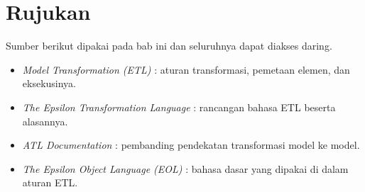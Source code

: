 \section{Rujukan}

Sumber berikut dipakai pada bab ini dan seluruhnya dapat diakses daring.

\begin{itemize}
  \item \textit{Model Transformation (ETL)} \cite{doc-etl}: aturan transformasi, pemetaan elemen, dan eksekusinya.
  \item \textit{The Epsilon Transformation Language} \cite{kolovos2008etl}: rancangan bahasa ETL beserta alasannya.
  \item \textit{ATL Documentation} \cite{doc-atl}: pembanding pendekatan transformasi model ke model.
  \item \textit{The Epsilon Object Language (EOL)} \cite{kolovos2006eol}: bahasa dasar yang dipakai di dalam aturan ETL.
\end{itemize}
